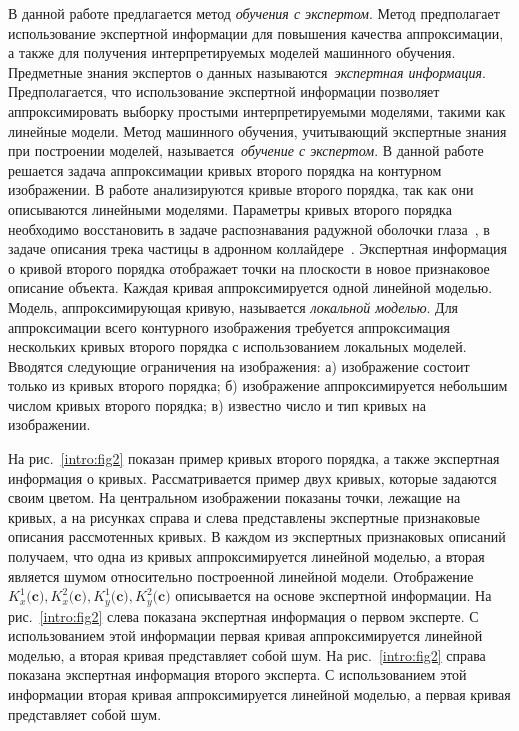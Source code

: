 \documentclass[12pt]{a&t}
\begin{document}
В данной работе предлагается метод \textit{обучения с экспертом}.
Метод предполагает использование экспертной информации для повышения качества аппроксимации, а также для получения интерпретируемых моделей машинного обучения.
Предметные знания экспертов о данных называются~\textit{экспертная информация}.
Предполагается, что использование экспертной информации позволяет аппроксимировать выборку простыми интерпретируемыми моделями, такими как линейные модели. Метод машинного обучения, учитывающий экспертные знания при построении моделей, называется~\textit{обучение с экспертом}.
В данной работе решается задача аппроксимации кривых второго порядка на контурном изображении.
В работе анализируются кривые второго порядка, так как они описываются линейными моделями. Параметры кривых второго порядка необходимо восстановить в задаче распознавания радужной оболочки глаза~\cite{Matveev2010, Matveev2014, Bowyer2010}, в задаче описания трека частицы в адронном коллайдере~\cite{Dalila2018}.
Экспертная информация о кривой второго порядка отображает точки на плоскости в новое признаковое описание объекта. 
Каждая кривая аппроксимируется одной линейной моделью.
Модель, аппроксимирующая кривую, называется \textit{локальной моделью}.
Для аппроксимации всего контурного изображения требуется аппроксимация нескольких кривых второго порядка с использованием локальных моделей.
Вводятся следующие ограничения на изображения: а) изображение состоит только из кривых второго порядка; б) изображение аппроксимируется небольшим числом кривых второго порядка; в) известно число и тип кривых на изображении.

На рис.~\ref{intro:fig2} показан пример кривых второго порядка, а также экспертная информация о кривых. Рассматривается пример двух кривых, которые задаются своим цветом. На центральном изображении показаны точки, лежащие на кривых, а на рисунках справа и слева представлены экспертные признаковые описания рассмотенных кривых. В каждом из экспертных признаковых описаний получаем, что одна из кривых аппроксимируется линейной моделью, а вторая является шумом относительно построенной линейной модели. Отображение~$K_x^1\bigr(\mathbf{c}\bigr), K_x^2\bigr(\mathbf{c}\bigr), K_y^1\bigr(\mathbf{c}\bigr), K_y^2\bigr(\mathbf{c}\bigr)$ описывается на основе экспертной информации. На рис.~\ref{intro:fig2} слева показана экспертная информация о первом эксперте. С использованием этой информации первая кривая аппроксимируется линейной моделью, а вторая кривая представляет собой шум. На рис.~\ref{intro:fig2} справа показана экспертная информация второго эксперта. С использованием этой информации вторая кривая аппроксимируется линейной моделью, а первая кривая представляет собой шум.
\end{document}
